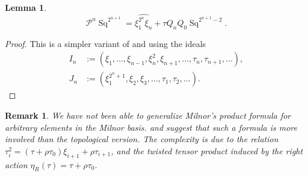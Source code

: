 \documentclass[11pt,hyp]{nyjm}
\newcommand{\PP}{\mathcal{P}}
\newcommand{\Sq}{\operatorname{Sq}}
\theoremstyle{theoremstyle}
\newtheorem{lemma}[theorem]{Lemma}
\newtheorem{remark}[theorem]{Remark}
\theoremstyle{definition}
\theoremstyle{theoremstyle}
\begin{document}
\begin{lemma}
  \label{lem:qSq}
  \[
  \PP^n\Sq^{2^{n+1}} = \widehat{\xi_1^{2^n}\xi_n} + \tau Q_n Q_0 \Sq^{2^{n+1} - 2}.
  \]
\end{lemma}
\begin{proof}
  This is a simpler variant of  and 
  using the ideals
  \begin{align*}
    I_n &:= (\xi_1, \dots, \xi_{n-1}, \xi_n^2, \xi_{n+1}, \dots, \tau_{n}, \tau_{n+1}, \dots), \\
    J_n &:= (\xi_{1}^{2^{n}+1}, \xi_{2}, \xi_{3}, \dots, \tau_{1}, \tau_{2}, \dots).
  \end{align*}
\end{proof}
\begin{remark}
  We have not been able to generalize Milnor's product formula for arbitrary elements in the Milnor basis.
   and  suggest that such a formula is more involved than the topological version.
  The complexity is due to the relation $\tau_i^2 = (\tau + \rho\tau_0)\xi_{i+1} + \rho \tau_{i+1}$,
  and the twisted tensor product induced by the right action $\eta_R(\tau) = \tau + \rho\tau_0$.
\end{remark}

{}

\end{document}
